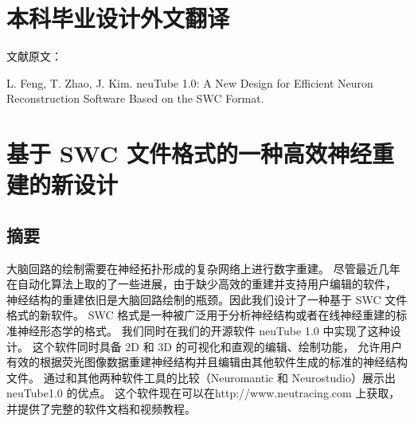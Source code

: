 {
\renewcommand{\baselinestretch}{1.25}\selectfont

{
  \titleformat{\chapter}[block]{\erhao\songti\bfseries\filcenter}{}{0em}{}{}
  \chapter{本科毕业设计外文翻译}
}

{
  \setlength{\parindent}{0em}

  文献原文：

  L. Feng, T. Zhao, J. Kim. neuTube 1.0: A New Design for Efficient Neuron Reconstruction Software Based on the SWC Format. \par
}

\vspace{2em}

{
  \renewcommand{\cleardoublepage}{}
  \renewcommand{\clearpage}{}
  \titleformat{\chapter}[block]{\sanhao\songti\bfseries\filcenter}{}{0em}{}{}
  \chapter*{基于 SWC 文件格式的一种高效神经重建的新设计}
}

\section*{摘要}

大脑回路的绘制需要在神经拓扑形成的复杂网络上进行数字重建。 尽管最近几年在自动化算法上取的了一些进展，由于缺少高效的重建并支持用户编辑的软件， 神经结构的重建依旧是大脑回路绘制的瓶颈。因此我们设计了一种基于 SWC 文件格式的新软件。 SWC 格式是一种被广泛用于分析神经结构或者在线神经重建的标准神经形态学的格式。 我们同时在我们的开源软件 neuTube 1.0 中实现了这种设计。 这个软件同时具备 2D 和 3D 的可视化和直观的编辑、绘制功能， 允许用户有效的根据荧光图像数据重建神经结构并且编辑由其他软件生成的标准的神经结构文件。 通过和其他两种软件工具的比较（Neuromantic 和 Neurostudio）展示出 neuTube1.0 的优点。 这个软件现在可以在http://www.neutracing.com 上获取， 并提供了完整的软件文档和视频教程。

}
